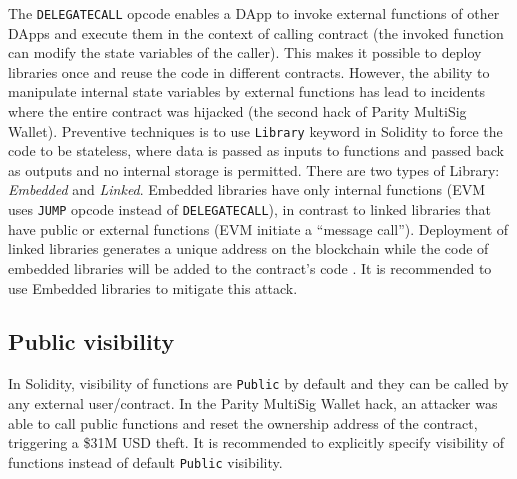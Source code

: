 The \texttt{DELEGATECALL} opcode enables a DApp to invoke external functions of other DApps and execute them in the context of calling contract (\ie the invoked function can modify the state variables of the caller). This makes it possible to deploy libraries once and reuse the code in different contracts. However, the ability to manipulate internal state variables by external functions has lead to incidents where the entire contract was hijacked (\cf the second hack of Parity MultiSig Wallet\cite{ParitySecondHack}). Preventive techniques is to use \texttt{Library} keyword in Solidity to force the code to be stateless, where data is passed as inputs to functions and passed back as outputs and no internal storage is permitted\cite{LIB1}. There are two types of Library: \textit{Embedded} and \textit{Linked}. Embedded libraries have only internal functions (EVM uses \texttt{JUMP} opcode instead of \texttt{DELEGATECALL}), in contrast to linked libraries that have public or external functions (EVM initiate a ``message call''). Deployment of linked libraries generates a unique address on the blockchain while the code of embedded libraries will be added to the contract's code \cite{LIB2}. It is recommended to use Embedded libraries to mitigate this attack.

\subsection{Public visibility}\label{subsec:pvis}

In Solidity, visibility of functions are \texttt{Public} by default and they can be called by any external user/contract. In the Parity MultiSig Wallet hack\cite{ParityFirstHack}, an attacker was able to call public functions and reset the ownership address of the contract, triggering a \$31M USD theft. It is recommended to explicitly specify visibility of functions instead of default \texttt{Public} visibility.


